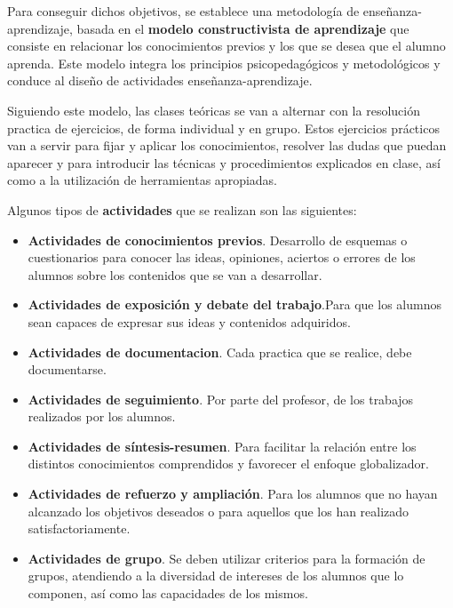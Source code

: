 \documentclass[spanish,12pt, a4paper,twoside]{paper}
\begin{document}
Para conseguir dichos objetivos, se establece una metodología de enseñanza-aprendizaje, basada en el \textbf{modelo constructivista de aprendizaje} que consiste en relacionar los conocimientos previos y los que se desea que el alumno aprenda. Este modelo integra los principios psicopedagógicos y metodológicos y conduce al diseño de actividades enseñanza-aprendizaje.

Siguiendo este modelo, las clases teóricas se van a alternar con la resolución practica de ejercicios, de forma individual y en grupo. Estos ejercicios prácticos van a servir para fijar y aplicar los conocimientos, resolver las dudas que puedan aparecer y para introducir las técnicas y procedimientos explicados en clase, así como a la utilización de herramientas apropiadas. %

Algunos tipos de \textbf{actividades} que se realizan son las siguientes:
\begin{itemize}
\item \textbf{Actividades de conocimientos previos}. Desarrollo de esquemas o cuestionarios para conocer las ideas, opiniones, aciertos o errores de los alumnos sobre los contenidos que se van a desarrollar.
\item \textbf{Actividades de exposición y debate del trabajo}.Para que los alumnos sean capaces de expresar sus ideas y contenidos adquiridos.
\item \textbf{Actividades de documentacion}. Cada practica que se realice, debe documentarse.
\item \textbf{Actividades de seguimiento}. Por parte del profesor, de los trabajos realizados por los alumnos.
\item \textbf{Actividades de síntesis-resumen}. Para facilitar la relación entre los distintos conocimientos comprendidos y favorecer el enfoque globalizador.
\item \textbf{Actividades de refuerzo y ampliación}. Para los alumnos que no hayan alcanzado los objetivos deseados o para aquellos que los han realizado satisfactoriamente.
\item \textbf{Actividades de grupo}. Se deben utilizar criterios para la formación de grupos, atendiendo a la diversidad de intereses de los alumnos que lo componen, así como las capacidades de los mismos.
\end{itemize}

\end{document}

